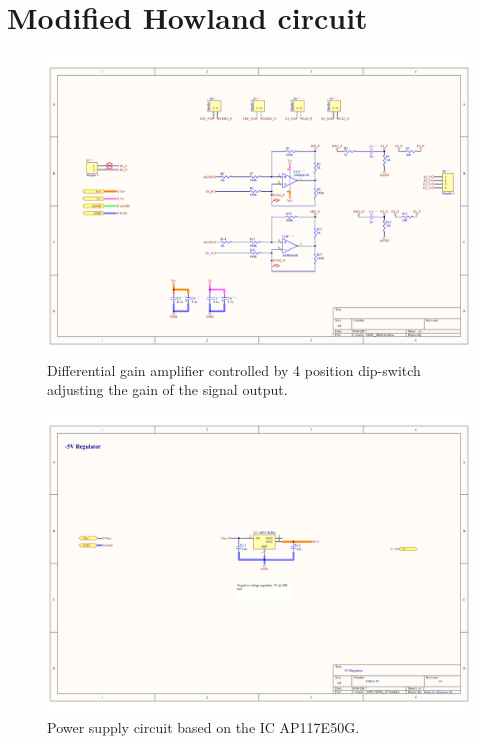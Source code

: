 \section*{Modified Howland circuit}
\label{Appendix: MHC}
\begin{figure}[!htpb]
	\centering
	\includegraphics[width=0.9\paperwidth,keepaspectratio,angle=90]{MHC}
	\caption[Schematic of the differential gain amplifier circuit]{Differential gain amplifier controlled by 4 position dip-switch adjusting the gain of the signal output.}
	\label{fig:MHC}
\end{figure}

\begin{landscape}
	\begin{figure}[!htpb]
		\centering
		\includegraphics[width=0.9\paperwidth,keepaspectratio]{MHC_PS_5}
		\caption[Positive power supply (\SI{5}{\volt}) for the modified Howland circuit]{Power supply circuit based on the IC AP117E50G.}
		\label{fig:MHC PS 5}
	\end{figure}
\end{landscape}

